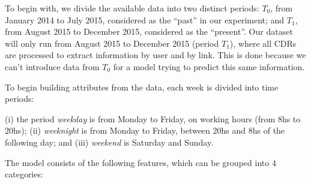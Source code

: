 To begin with, we divide the available data into two distinct periods:
$T_0$, from January 2014 to July 2015, considered as the ``past'' in our experiment; and $T_1$, from August 2015 to December 2015, considered as the ``present''.
Our dataset will only run from August 2015 to December 2015 (period $T_1$), where all CDRs are processed to extract information by user and by link.
This is done because we can't introduce data from $T_0$ for a model trying to predict this same information.

To begin building attributes from the data, each week is divided into time periods:
\begin{definition}\label{def:week-periods}
	(i) the period \textit{weekday} is from Monday to Friday, on working hours (from 8hs to 20hs); (ii) \textit{weeknight} is from Monday to Friday, between 20hs and 8hs of the following day;
	and (iii) \textit{weekend} is Saturday and Sunday.
\end{definition}

The model consists of the following features, which can be grouped into 4 categories:

